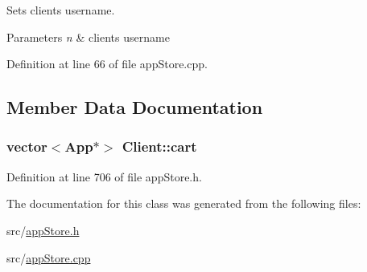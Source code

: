 Sets clients username. 


\begin{DoxyParams}{Parameters}
{\em n} & clients username \\
\hline
\end{DoxyParams}


Definition at line 66 of file app\-Store.\-cpp.



\subsection{Member Data Documentation}
\hypertarget{class_client_aa3a20b0fa8ebba5e1e7f6826b9b6acff}{
\subsubsection[{cart}]{\setlength{\rightskip}{0pt plus 5cm}vector$<${\bf App}$\ast$$>$ Client\-::cart}}\label{class_client_aa3a20b0fa8ebba5e1e7f6826b9b6acff}


Definition at line 706 of file app\-Store.\-h.



The documentation for this class was generated from the following files\-:\begin{DoxyCompactItemize}
\item 
src/\hyperlink{app_store_8h}{app\-Store.\-h}\item 
src/\hyperlink{app_store_8cpp}{app\-Store.\-cpp}\end{DoxyCompactItemize}
